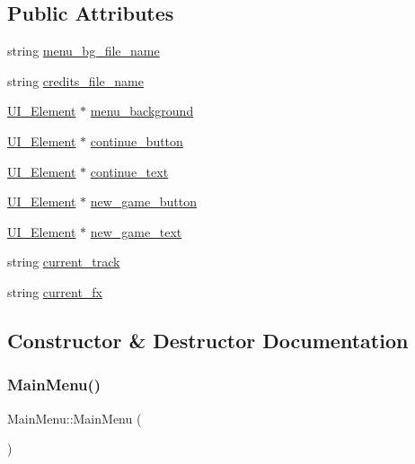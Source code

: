 \subsection*{Public Attributes}
\begin{DoxyCompactItemize}
\item 
string \mbox{\hyperlink{class_main_menu_a822b3d9f6df11b460e4710fc7c00488d}{menu\+\_\+bg\+\_\+file\+\_\+name}}
\item 
string \mbox{\hyperlink{class_main_menu_ae9cd90e84786013d736a163435a02932}{credits\+\_\+file\+\_\+name}}
\item 
\mbox{\hyperlink{class_u_i___element}{U\+I\+\_\+\+Element}} $\ast$ \mbox{\hyperlink{class_main_menu_a4813a8c395064afb65ccfa73e155f928}{menu\+\_\+background}}
\item 
\mbox{\hyperlink{class_u_i___element}{U\+I\+\_\+\+Element}} $\ast$ \mbox{\hyperlink{class_main_menu_a6448caa41b81885d89a553db5ba0eb48}{continue\+\_\+button}}
\item 
\mbox{\hyperlink{class_u_i___element}{U\+I\+\_\+\+Element}} $\ast$ \mbox{\hyperlink{class_main_menu_a08724bba4784093a3dbe695359df3f8d}{continue\+\_\+text}}
\item 
\mbox{\hyperlink{class_u_i___element}{U\+I\+\_\+\+Element}} $\ast$ \mbox{\hyperlink{class_main_menu_a1b92e84d483b72207057f7b1773b19c0}{new\+\_\+game\+\_\+button}}
\item 
\mbox{\hyperlink{class_u_i___element}{U\+I\+\_\+\+Element}} $\ast$ \mbox{\hyperlink{class_main_menu_a8dfe7dfc1c0bcc92e000529887aec722}{new\+\_\+game\+\_\+text}}
\item 
string \mbox{\hyperlink{class_main_menu_a0fe5d8e56ccbf1d6c1503a1f841fff21}{current\+\_\+track}}
\item 
string \mbox{\hyperlink{class_main_menu_a48ad3945dae84496334202f6afae4d6b}{current\+\_\+fx}}
\end{DoxyCompactItemize}


\subsection{Constructor \& Destructor Documentation}
\mbox{\label{class_main_menu_a53eecf9d5ffd094f54ac4193e7e57eaf}} 
\subsubsection{\texorpdfstring{MainMenu()}{MainMenu()}}
{\footnotesize\ttfamily Main\+Menu\+::\+Main\+Menu (\begin{DoxyParamCaption}{ }\end{DoxyParamCaption})}

